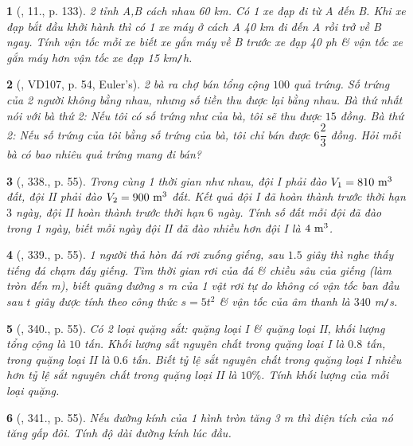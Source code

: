 \documentclass{article}
\newtheorem{baitoan}{}
\begin{document}
\begin{baitoan}[\cite{Kien_dai_so_9}, 11., p. 133]
	2 tỉnh A,B cách nhau {\rm60 km}. Có 1 xe đạp đi từ A đến B. Khi xe đạp bắt đầu khởi hành thì có 1 xe máy ở cách A {\rm40 km} đi đến A rồi trở về B ngay. Tính vận tốc mỗi xe biết xe gắn máy về B trước xe đạp {\rm40 ph} \& vận tốc xe gắn máy hơn vận tốc xe đạp {\rm15 km{\tt/}h}.
\end{baitoan}

\begin{baitoan}[\cite{Binh_Toan_9_tap_2}, VD107, p. 54, Euler's]
	2 bà ra chợ bán tổng cộng $100$ quả trứng. Số trứng của 2 người không bằng nhau, nhưng số tiền thu được lại bằng nhau. Bà thứ nhất nói với bà thứ 2: Nếu tôi có số trứng như của bà, tôi sẽ thu được $15$ đồng. Bà thứ 2: Nếu số trứng của tôi bằng số trứng của bà, tôi chỉ bán được $6\dfrac{2}{3}$ đồng. Hỏi mỗi bà có bao nhiêu quả trứng mang đi bán?
\end{baitoan}

\begin{baitoan}[\cite{Binh_Toan_9_tap_2}, 338., p. 55]
	Trong cùng 1 thời gian như nhau, đội I phải đào $V_1 = 810\ {\rm m}^3$ đất, đội II phải đào $V_2 = 900\ {\rm m}^3$ đất. Kết quả đội I đã hoàn thành trước thời hạn $3$ ngày, đội II hoàn thành trước thời hạn $6$ ngày. Tính số đất mỗi đội đã đào trong 1 ngày, biết mỗi ngày đội II đã đào nhiều hơn đội I là $\rm4\ m^3$.
\end{baitoan}

\begin{baitoan}[\cite{Binh_Toan_9_tap_2}, 339., p. 55]
	1 người thả hòn đá rơi xuống giếng, sau $1.5$ giây thì nghe thấy tiếng đá chạm đáy giếng. Tìm thời gian rơi của đá \& chiều sâu của giếng (làm tròn đến {\rm m}), biết quãng đường $s$ {\rm m} của 1 vật rơi tự do không có vận tốc ban đầu sau $t$ giây được tính theo công thức $s = 5t^2$ \& vận tốc của âm thanh là $340$ {\rm m{\tt/}s}.
\end{baitoan}

\begin{baitoan}[\cite{Binh_Toan_9_tap_2}, 340., p. 55]
	Có 2 loại quặng sắt: quặng loại I \& quặng loại II, khối lượng tổng cộng là $10$ tấn. Khối lượng sắt nguyên chất trong quặng loại I là $0.8$ tấn, trong quặng loại II là $0.6$ tấn. Biết tỷ lệ sắt nguyên chất trong quặng loại I nhiều hơn tỷ lệ sắt nguyên chất trong quặng loại II là $10\%$. Tính khối lượng của mỗi loại quặng.
\end{baitoan}

\begin{baitoan}[\cite{Binh_Toan_9_tap_2}, 341., p. 55]
	Nếu đường kính của 1 hình tròn tăng {\rm3 m} thì diện tích của nó tăng gấp đôi. Tính độ dài đường kính lúc đầu.
\end{baitoan}
\end{document}
